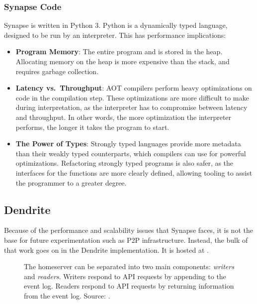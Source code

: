 \subsubsection{Synapse Code}
Synapse is written in Python 3.
Python is a dynamically typed language, designed to be run by an interpreter.
This has performance implications:
\begin{itemize}
      \item{
            \textbf{Program Memory}:
            The entire program and is stored in the heap.
            Allocating memory on the heap is more expensive than the stack, and requires garbage collection.
            }
      \item{
            \textbf{Latency vs.~Throughput}:
            \ac{AOT} compilers perform heavy optimizations on code in the compilation step.
            These optimizations are more difficult to make during interpretation, as the interpreter has to compromise between latency and throughput.
            In other words, the more optimization the interpreter performs, the longer it takes the program to start.
            }
      \item{
            \textbf{The Power of Types}:
            Strongly typed languages provide more metadata than their weakly typed counterparts, which compilers can use for powerful optimizations.
            Refactoring strongly typed programs is also safer, as the interfaces for the functions are more clearly defined, allowing tooling to assist the programmer to a greater degree.
            }
\end{itemize}

\subsection{Dendrite}
Because of the performance and scalability issues that Synapse faces, it is not the base for future experimentation such as \ac{P2P} infrastructure.
Instead, the bulk of that work goes on in the Dendrite implementation.
It is hosted at .

\begin{figure}
      \centering
      \resizebox{0.5\linewidth}{!}{}
      \caption{
            The homeserver can be separated into two main components: \textit{writers} and \textit{readers}.
            Writers respond to API requests by appending to the event log.
            Readers respond to API requests by returning information from the event log.
            Source: \cite{dendrite_design_md}.
      }
      \label{fig:dendrite_design}
\end{figure}

